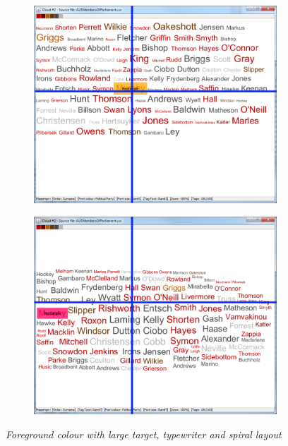 \begin{figure}[h!]
\centering
\begin{subfigure}{.5\textwidth}
  \centering
  \includegraphics[scale=0.25]{C2S2L2fixation.png}
  \caption{}
\end{subfigure}%
\begin{subfigure}{.5\textwidth}
  \centering
  \includegraphics[scale=0.25]{C2S2L1fixation.png}
  \caption{}
\end{subfigure}
\caption{\textit{Foreground colour with large target, typewriter and spiral layout}}
\label{fig:fixationdataexp1}
\end{figure}

